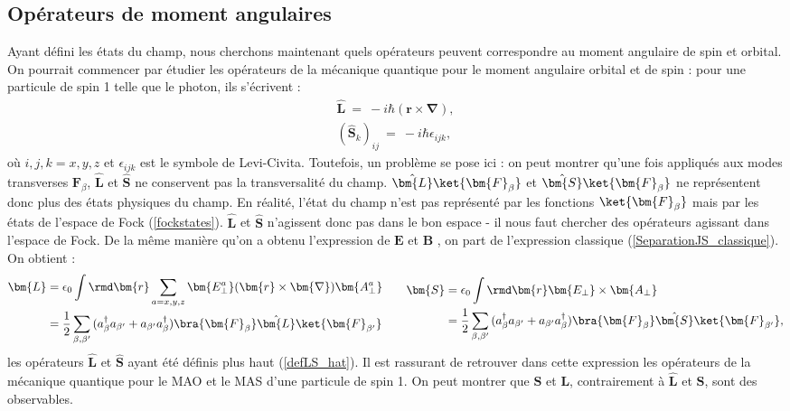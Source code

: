 \subsection{Opérateurs de moment angulaires} 
Ayant défini les états du champ, nous cherchons maintenant quels opérateurs peuvent correspondre au moment angulaire de spin et orbital. On pourrait commencer par étudier les opérateurs de la mécanique quantique pour le moment angulaire orbital et de spin : pour une particule de spin 1 telle que le photon, ils s'écrivent :
\begin{equation}
\begin{aligned}
\hat{\bm{L}}~=~-i\hbar(\bm{r}\times\bm{\nabla}),\\
(\hat{\bm{S}}_k)_{ij}~=~-i\hbar\epsilon_{ijk},
\end{aligned} 
\label{defLS_hat}
\end{equation}
où $i,j,k=x,y,z$ et $\epsilon_{ijk}$ est le symbole de Levi-Civita.
Toutefois, un problème se pose ici : on peut montrer qu'une fois appliqués aux modes transverses $\bm{F}_\beta$, $\hat{\bm{L}}$ et $\hat{\bm{S}}$ ne conservent pas la transversalité du champ. $\hat{\bm{L}}\ket{\bm{F}_\beta}$ et $\hat{\bm{S}}\ket{\bm{F}_\beta}$ ne représentent donc plus des états physiques du champ. En réalité, l'état du champ n'est pas représenté par les fonctions $\ket{\bm{F}_\beta}$ mais par les états de l'espace de Fock (\ref{fockstates}). $\hat{\bm{L}}$ et $\hat{\bm{S}}$ n'agissent donc pas dans le bon espace - il nous faut chercher des opérateurs agissant dans l'espace de Fock. De la même manière qu'on a obtenu l'expression de $\bm{E}$ et $\bm{B}$ , on part de l'expression classique (\ref{SeparationJS_classique}). On obtient  :
\begin{equation}
\begin{aligned}[c]
\bm{L}&=\epsilon_0\int{\rmd\bm{r}\sum_{a=x,y,z} \bm{E^a_{\bot}}(\bm{r}\times\bm{\nabla})\bm{A^a_{\bot}}}\\
&=\frac{1}{2}\sum_{\beta,\beta'}{(a^{\dag}_{\beta}a_{\beta'}+a_{\beta'}a^{\dag}_{\beta})}\bra{\bm{F}_\beta}\hat{\bm{L}}\ket{\bm{F}_{\beta'}}
\end{aligned}
\qquad
\begin{aligned}[c]
\bm{S}&=\epsilon_0\int{\rmd\bm{r}\bm{E_{\bot}}\times\bm{A_{\bot}}}\\
&=\frac{1}{2}\sum_{\beta,\beta'}{(a^{\dag}_{\beta}a_{\beta'}+a_{\beta'}a^{\dag}_{\beta})}\bra{\bm{F}_\beta}\hat{\bm{S}}\ket{\bm{F}_{\beta'}},
\end{aligned}
\label{eqLS_QED}
\end{equation} 
les opérateurs $\hat{\bm{L}}$ et $\hat{\bm{S}}$ ayant été définis plus haut (\ref{defLS_hat}).
Il est rassurant de retrouver dans cette expression les opérateurs de la mécanique quantique pour le MAO et le MAS d'une particule de spin 1. On peut montrer que $\bm{S}$ et $\bm{L}$, contrairement à $\hat{\bm{L}}$ et $\hat{\bm{S}}$, sont des observables.


